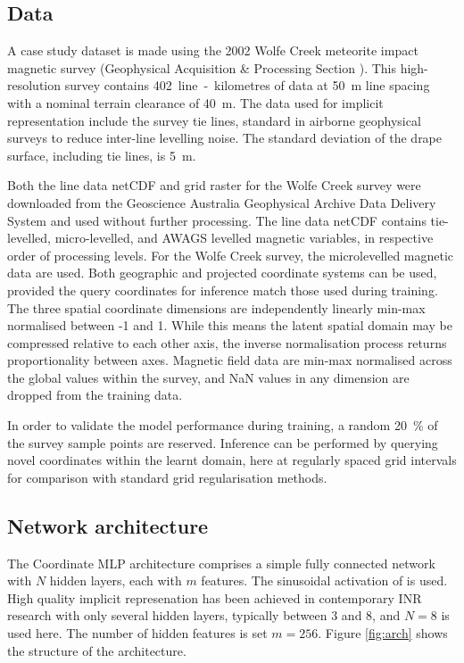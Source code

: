 \documentclass[manuscript.tex]{subfiles}
\begin{document}
\subsection{Data}
A case study dataset is made using the 2002 Wolfe Creek meteorite impact magnetic survey (Geophysical Acquisition \& Processing Section \cite*{wolfecreek2019}).
This high-resolution survey contains \SI{402}{line-kilometres} of data at \SI{50}{\m} line spacing with a nominal terrain clearance of \SI{40}{\m}.
The data used for implicit representation include the survey tie lines, standard in airborne geophysical surveys to reduce inter-line levelling noise.
The standard deviation of the drape surface, including tie lines, is \SI{5}{\m}.

Both the line data netCDF and grid raster for the Wolfe Creek survey were downloaded from the Geoscience Australia Geophysical Archive Data Delivery System and used without further processing.
The line data netCDF contains tie-levelled, micro-levelled, and AWAGS levelled magnetic variables, in respective order of processing levels.
For the Wolfe Creek survey, the microlevelled magnetic data are used.
Both geographic and projected coordinate systems can be used, provided the query coordinates for inference match those used during training.
The three spatial coordinate dimensions are independently linearly min-max normalised between -1 and 1.
While this means the latent spatial domain may be compressed relative to each other axis, the inverse normalisation process returns proportionality between axes.
Magnetic field data are min-max normalised across the global values within the survey, and NaN values in any dimension are dropped from the training data.

In order to validate the model performance during training, a random \qty{20}{\percent} of the survey sample points are reserved.
Inference can be performed by querying novel coordinates within the learnt domain, here at regularly spaced grid intervals for comparison with standard grid regularisation methods.

\subsection{Network architecture}
The Coordinate MLP architecture comprises a simple fully connected network with \(N\) hidden layers, each with \(m\) features.
The sinusoidal activation of \parencite{sitzmann2019siren} is used. %
High quality implicit represenation has been achieved in contemporary INR research with only several hidden layers, typically between 3 and 8, and \(N = 8\) is used here.
The number of hidden features is set \(m = 256\).
Figure \cref{fig:arch} shows the structure of the architecture.
\end{document}
